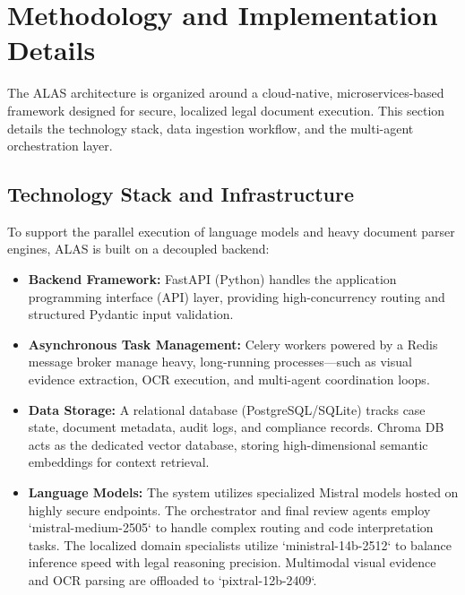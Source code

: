 \section{Methodology and Implementation Details}
The ALAS architecture is organized around a cloud-native, microservices-based framework designed for secure, localized legal document execution. This section details the technology stack, data ingestion workflow, and the multi-agent orchestration layer.

\subsection{Technology Stack and Infrastructure}
To support the parallel execution of language models and heavy document parser engines, ALAS is built on a decoupled backend:
\begin{itemize}
\item \textbf{Backend Framework:} FastAPI (Python) handles the application programming interface (API) layer, providing high-concurrency routing and structured Pydantic input validation.
\item \textbf{Asynchronous Task Management:} Celery workers powered by a Redis message broker manage heavy, long-running processes—such as visual evidence extraction, OCR execution, and multi-agent coordination loops.
\item \textbf{Data Storage:} A relational database (PostgreSQL/SQLite) tracks case state, document metadata, audit logs, and compliance records. Chroma DB acts as the dedicated vector database, storing high-dimensional semantic embeddings for context retrieval.
\item \textbf{Language Models:} The system utilizes specialized Mistral models hosted on highly secure endpoints. The orchestrator and final review agents employ `mistral-medium-2505` to handle complex routing and code interpretation tasks. The localized domain specialists utilize `ministral-14b-2512` to balance inference speed with legal reasoning precision. Multimodal visual evidence and OCR parsing are offloaded to `pixtral-12b-2409`.
\end{itemize}


